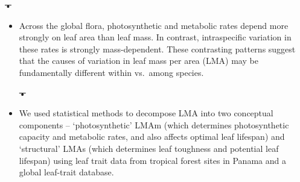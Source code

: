 \documentclass[12pt,]{article}
\theoremstyle{definition}
\theoremstyle{definition}
\theoremstyle{definition}
\theoremstyle{remark}
\providecommand{\DIFdeltex}[1]{{\protect\color{red}\sout{#1}}}                      %
\providecommand{\DIFaddbegin}{} %
\providecommand{\DIFaddend}{} %
\providecommand{\DIFdelbegin}{} %
\providecommand{\DIFdelend}{} %
\providecommand{\DIFdel}[1]{\texorpdfstring{\DIFdeltex{#1}}{}} %
\newcommand{\DIFscaledelfig}{0.5}
\newlength{\DIFdelgraphicswidth} %
\newlength{\DIFdelgraphicsheight} %
\newcommand{\DIFaddincludegraphics}[2][]{{\color{blue}\fbox{\DIFOincludegraphics[#1]{#2}}}} %
\newcommand{\DIFdelincludegraphics}[2][]{%
\sbox{\DIFdelgraphicsbox}{\DIFOincludegraphics[#1]{#2}}%
\settoboxwidth{\DIFdelgraphicswidth}{\DIFdelgraphicsbox} %
\settoboxtotalheight{\DIFdelgraphicsheight}{\DIFdelgraphicsbox} %
\scalebox{\DIFscaledelfig}{%
\parbox[b]{\DIFdelgraphicswidth}{\usebox{\DIFdelgraphicsbox}\\[-\baselineskip] \rule{\DIFdelgraphicswidth}{0em}}\llap{\resizebox{\DIFdelgraphicswidth}{\DIFdelgraphicsheight}{%
\setlength{\unitlength}{\DIFdelgraphicswidth}%
\begin{picture}(1,1)%
\thicklines\linethickness{2pt} %
{\color[rgb]{1,0,0}\put(0,0){\framebox(1,1){}}}%
{\color[rgb]{1,0,0}\put(0,0){\line( 1,1){1}}}%
{\color[rgb]{1,0,0}\put(0,1){\line(1,-1){1}}}%
\end{picture}%
}\hspace*{3pt}}} %
} %
\DeclareRobustCommand{\DIFaddbegin}{\DIFOaddbegin \let\includegraphics\DIFaddincludegraphics} %
\DeclareRobustCommand{\DIFaddend}{\DIFOaddend \let\includegraphics\DIFOincludegraphics} %
\DeclareRobustCommand{\DIFdelbegin}{\DIFOdelbegin \let\includegraphics\DIFdelincludegraphics} %
\DeclareRobustCommand{\DIFdelend}{\DIFOaddend \let\includegraphics\DIFOincludegraphics} %
\begin{document}
\DIFdelbegin \DIFdel{• }\DIFdelend \DIFaddbegin \begin{itemize}
\item
  \DIFaddend Across the global flora, photosynthetic and metabolic rates depend
  more strongly on leaf area than leaf mass. In contrast, intraspecific
  variation in these rates is strongly mass-dependent. These contrasting
  patterns suggest that the causes of variation in leaf mass per area
  (LMA) may be fundamentally different within vs.~among species.
\DIFdelbegin %

\DIFdel{• }\DIFdelend \DIFaddbegin \item
  \DIFaddend We used statistical methods to decompose LMA into two conceptual
  components -- `photosynthetic' LMAm (which determines photosynthetic
  capacity and metabolic rates, and also affects optimal leaf lifespan)
  and `structural' LMAs (which determines leaf toughness and potential
  leaf lifespan) using leaf trait data from tropical forest sites in
  Panama and a global leaf-trait database.
\DIFdelbegin %


\end{itemize}
\end{document}
